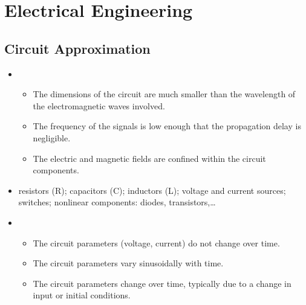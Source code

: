 \documentclass[letterpaper,10pt,english]{jupyterBook}
\begin{document}
\part{Electrical Engineering}

\sphinxstepscope


\chapter{Circuit Approximation}
\label{\detokenize{ch/circuits:circuit-approximation}}\label{\detokenize{ch/circuits:classical-electromagnetism-electrical-engineering}}\label{\detokenize{ch/circuits::doc}}
\sphinxAtStartPar
{}
\begin{itemize}
\item {} 
\sphinxAtStartPar
{}
\begin{itemize}
\item {} 
\sphinxAtStartPar
The dimensions of the circuit are much smaller than the wavelength of the electromagnetic waves involved.

\item {} 
\sphinxAtStartPar
The frequency of the signals is low enough that the propagation delay is negligible.

\item {} 
\sphinxAtStartPar
The electric and magnetic fields are confined within the circuit components.

\end{itemize}

\item {} 
\sphinxAtStartPar
{} resistors (R); capacitors (C); inductors (L); voltage and current sources; switches; non\sphinxhyphen{}linear components: diodes, transistors,…

\item {} 
\sphinxAtStartPar
{}
\begin{itemize}
\item {} 
\sphinxAtStartPar
{} The circuit parameters (voltage, current) do not change over time.

\item {} 
\sphinxAtStartPar
{} The circuit parameters vary sinusoidally with time.

\item {} 
\sphinxAtStartPar
{} The circuit parameters change over time, typically due to a change in input or initial conditions.

\end{itemize}

\end{itemize}
\end{document}
